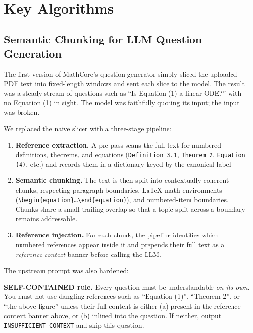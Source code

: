 \documentclass[11pt,a4paper]{article}
\newcommand{\code}[1]{\texttt{\small #1}}
\begin{document}
\section{Key Algorithms}
\label{sec:algorithms}

\subsection{Semantic Chunking for LLM Question Generation}
\label{sec:chunking}

The first version of MathCore's question generator simply sliced the uploaded PDF text into fixed-length windows and sent each slice to the model. The result was a steady stream of questions such as ``Is Equation (1) a linear ODE?'' with no Equation (1) in sight. The model was faithfully quoting its input; the input was broken.

We replaced the naïve slicer with a three-stage pipeline:

\begin{enumerate}[leftmargin=*]
    \item \textbf{Reference extraction.} A pre-pass scans the full text for numbered definitions, theorems, and equations (\code{Definition 3.1}, \code{Theorem 2}, \code{Equation (4)}, etc.) and records them in a dictionary keyed by the canonical label.
    \item \textbf{Semantic chunking.} The text is then split into contextually coherent chunks, respecting paragraph boundaries, LaTeX math environments (\code{\textbackslash begin\{equation\}\ldots\textbackslash end\{equation\}}), and numbered-item boundaries. Chunks share a small trailing overlap so that a topic split across a boundary remains addressable.
    \item \textbf{Reference injection.} For each chunk, the pipeline identifies which numbered references appear inside it and prepends their full text as a \emph{reference context} banner before calling the LLM.
\end{enumerate}

The upstream prompt was also hardened:

\begin{tcolorbox}[callout,title=Prompt Fragment (\code{api/extract.js})]
\begin{minipage}{\linewidth}
\footnotesize
\textbf{SELF-CONTAINED rule.} Every question must be understandable \emph{on its own}. You must not use dangling references such as ``Equation (1)'', ``Theorem 2'', or ``the above figure'' unless their full content is either (a) present in the reference-context banner above, or (b) inlined into the question. If neither, output \texttt{INSUFFICIENT\_CONTEXT} and skip this question.
\end{minipage}
\end{tcolorbox}
\end{document}
